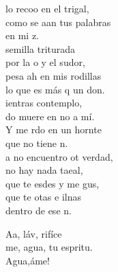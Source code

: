 \documentclass[12pt]{article}
\begin{document}
\begin{multicols*}{2}
\begin{cancion}
	lo recoo en el trigal, \\
	como se aan tus palabras \\
	en mi z. \\
	 semilla triturada \\
	por la o y el sudor, \\
	pesa ah en mis rodillas\\
	lo que es más q un don.\\
	ientras  contemplo, \\
	do muere en no a mí.\\
	Y me rdo en un hornte \\
	que no tiene n. \\
	a no encuentro ot verdad,\\
	 no hay nada taeal,\\
	que te esdes y me gus,\\
	que te otas e ilnas\\
	dentro de ese n.\\
\end{cancion}%

\begin{cancion}%
	Aa, láv, rifíce\\
	me, agua, tu espritu.\\
	Agua,áme!\\
\end{cancion}%


\end{multicols*}
\end{document}
